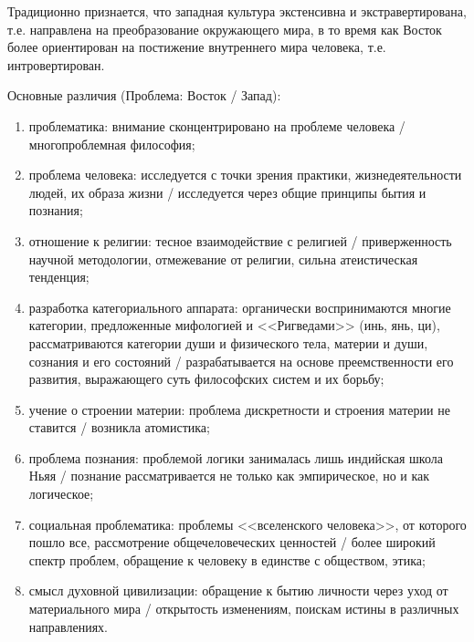 Традиционно признается, что западная культура экстенсивна и экстравертирована, т.е. направлена на
преобразование окружающего мира, в то время как Восток более ориентирован на постижение внутреннего
мира человека, т.е. интровертирован.

Основные различия (Проблема: Восток / Запад):
\begin{enumerate}
    \vspace*{-1.8ex}
    \itemsep-1.2ex
    \item проблематика: внимание сконцентрировано на проблеме человека / многопроблемная философия;
    \item проблема человека: исследуется с точки зрения практики, жизнедеятельности людей, их образа
        жизни / исследуется через общие принципы бытия и познания;
    \item отношение к религии: тесное взаимодействие с религией / приверженность научной
        методологии, отмежевание от религии, сильна атеистическая тенденция;
    \item разработка категориального аппарата: органически воспринимаются многие категории,
        предложенные мифологией и <<Ригведами>> (инь, янь, ци), рассматриваются категории души и
        физического тела, материи и души, сознания и его состояний / разрабатывается на основе
        преемственности его развития, выражающего суть философских систем и их борьбу;
    \item учение о строении материи: проблема дискретности и строения материи не ставится / возникла
        атомистика;
    \item проблема познания: проблемой логики занималась лишь индийская школа Ньяя / познание
        рассматривается не только как эмпирическое, но и как логическое;
    \item социальная проблематика: проблемы <<вселенского человека>>, от которого пошло все,
        рассмотрение общечеловеческих ценностей / более широкий спектр проблем, обращение к человеку
        в единстве с обществом, этика;
    \item смысл духовной цивилизации: обращение к бытию личности через уход от материального мира /
        открытость изменениям, поискам истины в различных направлениях.
\end{enumerate}

